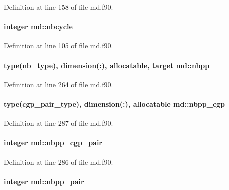 Definition at line 158 of file md.\-f90.

\hypertarget{classmd_a1559f2bfe56403d7d3924e76f5f3e29f}{
\paragraph[{nbcycle}]{\setlength{\rightskip}{0pt plus 5cm}integer md\-::nbcycle}}\label{classmd_a1559f2bfe56403d7d3924e76f5f3e29f}


Definition at line 105 of file md.\-f90.

\hypertarget{classmd_adfb1f361ae92fbae49db0f6a0c32e51b}{
\paragraph[{nbpp}]{\setlength{\rightskip}{0pt plus 5cm}type({\bf nb\-\_\-type}), dimension(\-:), allocatable, target md\-::nbpp}}\label{classmd_adfb1f361ae92fbae49db0f6a0c32e51b}


Definition at line 264 of file md.\-f90.

\hypertarget{classmd_a87ed8e074047fb2d7019c52e807836fb}{
\paragraph[{nbpp\-\_\-cgp}]{\setlength{\rightskip}{0pt plus 5cm}type({\bf cgp\-\_\-pair\-\_\-type}), dimension(\-:), allocatable md\-::nbpp\-\_\-cgp}}\label{classmd_a87ed8e074047fb2d7019c52e807836fb}


Definition at line 287 of file md.\-f90.

\hypertarget{classmd_a434ce36afe2ea6dccbe1ea8d7ba33639}{
\paragraph[{nbpp\-\_\-cgp\-\_\-pair}]{\setlength{\rightskip}{0pt plus 5cm}integer md\-::nbpp\-\_\-cgp\-\_\-pair}}\label{classmd_a434ce36afe2ea6dccbe1ea8d7ba33639}


Definition at line 286 of file md.\-f90.

\hypertarget{classmd_a4dfac27b4d89f55bc63053cad0861dba}{
\paragraph[{nbpp\-\_\-pair}]{\setlength{\rightskip}{0pt plus 5cm}integer md\-::nbpp\-\_\-pair}}\label{classmd_a4dfac27b4d89f55bc63053cad0861dba}


